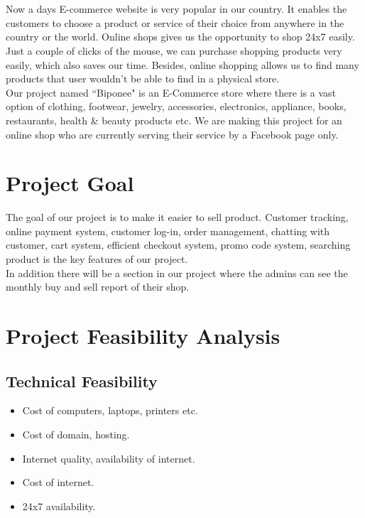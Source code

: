 

\section*{}
Now a days E-commerce website is very popular in our country. It enables the customers to choose a product or service of their choice from anywhere in the country or the world. Online shops gives us the opportunity to shop 24x7 easily. Just a couple of clicks of the mouse, we can purchase shopping products very easily, which also saves our time. Besides, online shopping allows us to find many products that user wouldn't be able to find in a physical store.\\
Our project named ``Biponee" is an E-Commerce store where there is a vast option of clothing, footwear, jewelry, accessories, electronics, appliance, books, restaurants, health & beauty products etc. We are making this project for an online shop who are currently serving their service by a Facebook page only.\\



\section{Project Goal}
The goal of our project is to make it easier to sell product. Customer tracking, online payment system, customer log-in, order management, chatting with customer, cart system, efficient checkout system, promo code system, searching product is the key features of our project.\\
In addition there will be a section in our project where the admins can see the monthly buy and sell report of their shop.
\label{sec:pgoal}



\section{ Project Feasibility Analysis}
  
  \subsection{Technical Feasibility}
  \begin{itemize}
  \item Cost of computers, laptops, printers etc.
  \item Cost of domain, hosting.
  \item Internet quality, availability of internet.
  \item Cost of internet.
  \item 24x7 availability.
\end{itemize}

